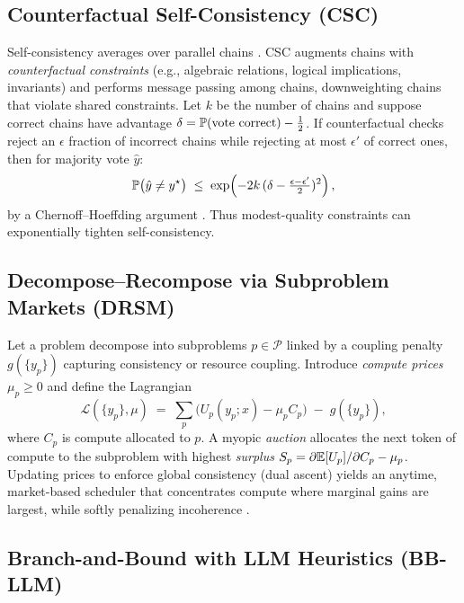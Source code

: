 \subsection{Counterfactual Self-Consistency (CSC)}

Self-consistency averages over parallel chains \cite{wang2023selfconsistency}. CSC augments chains with \emph{counterfactual constraints} (e.g., algebraic relations, logical implications, invariants) and performs message passing among chains, downweighting chains that violate shared constraints.
Let $k$ be the number of chains and suppose correct chains have advantage $\delta = \mathbb{P}(\text{vote correct}) - \tfrac{1}{2}$. 
If counterfactual checks reject an $\epsilon$ fraction of incorrect chains while rejecting at most $\epsilon'$ of correct ones, then for majority vote $\hat{y}$:
\begin{equation}
\mathbb{P}\big(\hat{y} \neq y^\star\big) 
\;\le\; 
\exp\!\left(-2 k\,(\delta - \tfrac{\epsilon-\epsilon'}{2})^2\right),
\label{eq:csc-bound}
\end{equation}
by a Chernoff--Hoeffding argument \cite{hoeffding1963}. Thus modest-quality constraints can exponentially tighten self-consistency.

\subsection{Decompose--Recompose via Subproblem Markets (DRSM)}

Let a problem decompose into subproblems $p \in \mathcal{P}$ linked by a coupling penalty $g(\{y_p\})$ capturing consistency or resource coupling. 
Introduce \emph{compute prices} $\mu_p \ge 0$ and define the Lagrangian
\begin{equation}
\mathcal{L}(\{y_p\}, \mu) \;=\; \sum_{p} \big( U_p(y_p;x) - \mu_p C_p \big) \;-\; g(\{y_p\}),
\end{equation}
where $C_p$ is compute allocated to $p$.
A myopic \emph{auction} allocates the next token of compute to the subproblem with highest \emph{surplus} 
$S_p = \partial \mathbb{E}[U_p]/\partial C_p - \mu_p$.
Updating prices to enforce global consistency (dual ascent) yields an anytime, market-based scheduler that concentrates compute where marginal gains are largest, while softly penalizing incoherence \cite{boyd2011admm}.

\subsection{Branch-and-Bound with LLM Heuristics (BB-LLM)}

